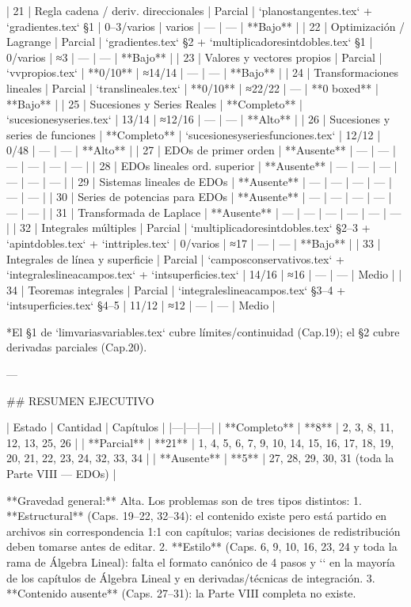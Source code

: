 \begin{myproof}
\begin{pasos}
\begin{example}
\begin{rem}
\begin{prob}
| 21 | Regla cadena / deriv. direccionales | Parcial | `planostangentes.tex` + `gradientes.tex` §1 | 0–3/varios | varios | — | — | **Bajo** |
| 22 | Optimización / Lagrange | Parcial | `gradientes.tex` §2 + `multiplicadoresintdobles.tex` §1 | 0/varios | ≈3 | — | — | **Bajo** |
| 23 | Valores y vectores propios | Parcial | `vvpropios.tex` | **0/10** | ≈14/14 | — | — | **Bajo** |
| 24 | Transformaciones lineales | Parcial | `translineales.tex` | **0/10** | ≈22/22 | — | **0 boxed** | **Bajo** |
| 25 | Sucesiones y Series Reales | **Completo** | `sucesionesyseries.tex` | 13/14 | ≈12/16 | — | — | **Alto** |
| 26 | Sucesiones y series de funciones | **Completo** | `sucesionesyseriesfunciones.tex` | 12/12 | 0/48 | — | — | **Alto** |
| 27 | EDOs de primer orden | **Ausente** | — | — | — | — | — | — |
| 28 | EDOs lineales ord. superior | **Ausente** | — | — | — | — | — | — |
| 29 | Sistemas lineales de EDOs | **Ausente** | — | — | — | — | — | — |
| 30 | Series de potencias para EDOs | **Ausente** | — | — | — | — | — | — |
| 31 | Transformada de Laplace | **Ausente** | — | — | — | — | — | — |
| 32 | Integrales múltiples | Parcial | `multiplicadoresintdobles.tex` §2–3 + `apintdobles.tex` + `inttriples.tex` | 0/varios | ≈17 | — | — | **Bajo** |
| 33 | Integrales de línea y superficie | Parcial | `camposconservativos.tex` + `integraleslineacampos.tex` + `intsuperficies.tex` | 14/16 | ≈16 | — | — | Medio |
| 34 | Teoremas integrales | Parcial | `integraleslineacampos.tex` §3–4 + `intsuperficies.tex` §4–5 | 11/12 | ≈12 | — | — | Medio |

*El §1 de `limvariasvariables.tex` cubre límites/continuidad (Cap.19); el §2 cubre derivadas parciales (Cap.20).

---

## RESUMEN EJECUTIVO

| Estado | Cantidad | Capítulos |
|---|---|---|
| **Completo** | **8** | 2, 3, 8, 11, 12, 13, 25, 26 |
| **Parcial** | **21** | 1, 4, 5, 6, 7, 9, 10, 14, 15, 16, 17, 18, 19, 20, 21, 22, 23, 24, 32, 33, 34 |
| **Ausente** | **5** | 27, 28, 29, 30, 31 (toda la Parte VIII — EDOs) |

**Gravedad general:** Alta. Los problemas son de tres tipos distintos:
1. **Estructural** (Caps. 19–22, 32–34): el contenido existe pero está partido en archivos sin correspondencia 1:1 con capítulos; varias decisiones de redistribución deben tomarse antes de editar.
2. **Estilo** (Caps. 6, 9, 10, 16, 23, 24 y toda la rama de Álgebra Lineal): falta el formato canónico de 4 pasos y `\boxed{}` en la mayoría de los capítulos de Álgebra Lineal y en derivadas/técnicas de integración.
3. **Contenido ausente** (Caps. 27–31): la Parte VIII completa no existe.


\end{prob}
\end{rem}
\end{example}
\end{pasos}
\end{myproof}
